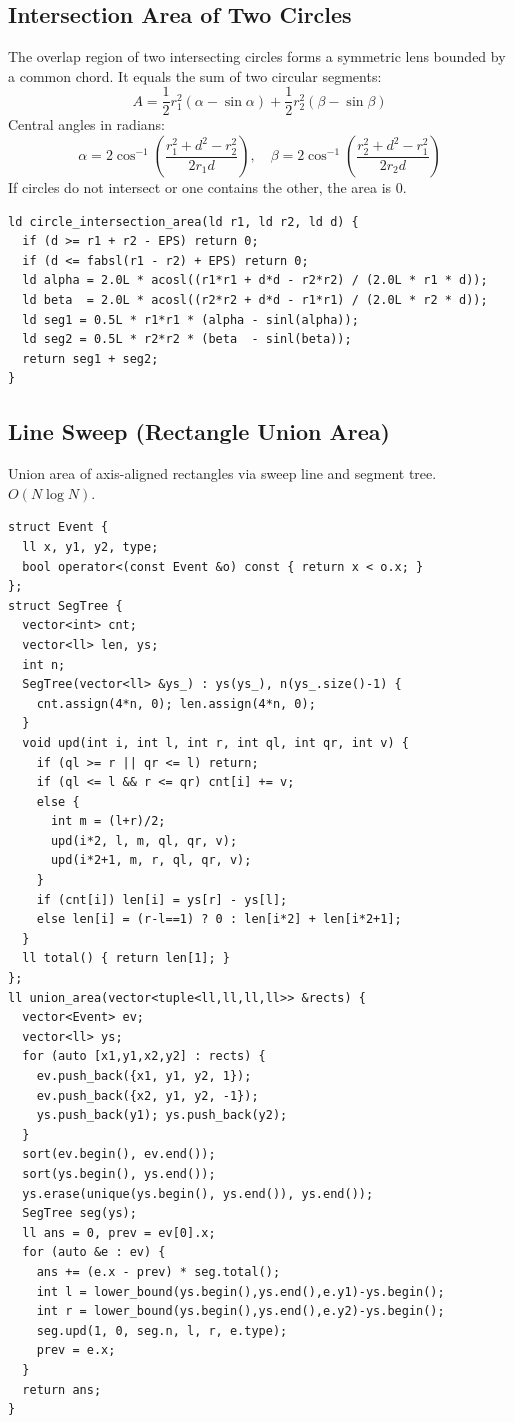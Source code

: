\subsection{Intersection Area of Two Circles}
The overlap region of two intersecting circles forms a symmetric lens bounded by a common chord.
It equals the sum of two circular segments:
\[A = \frac{1}{2}r_1^2(\alpha - \sin\alpha) + \frac{1}{2}r_2^2(\beta - \sin\beta)\]
Central angles in radians:
\[\alpha = 2\cos^{-1}\left(\frac{r_1^2 + d^2 - r_2^2}{2r_1 d}\right),\quad \beta = 2\cos^{-1}\left(\frac{r_2^2 + d^2 - r_1^2}{2r_2 d}\right)\]
If circles do not intersect or one contains the other, the area is 0.
\begin{verbatim}
ld circle_intersection_area(ld r1, ld r2, ld d) {
  if (d >= r1 + r2 - EPS) return 0;
  if (d <= fabsl(r1 - r2) + EPS) return 0;
  ld alpha = 2.0L * acosl((r1*r1 + d*d - r2*r2) / (2.0L * r1 * d));
  ld beta  = 2.0L * acosl((r2*r2 + d*d - r1*r1) / (2.0L * r2 * d));
  ld seg1 = 0.5L * r1*r1 * (alpha - sinl(alpha));
  ld seg2 = 0.5L * r2*r2 * (beta  - sinl(beta));
  return seg1 + seg2;
}
\end{verbatim}

\subsection{Line Sweep (Rectangle Union Area)}
Union area of axis-aligned rectangles via sweep line and segment tree. $O(N \log N)$.
\begin{verbatim}
struct Event {
  ll x, y1, y2, type;
  bool operator<(const Event &o) const { return x < o.x; }
};
struct SegTree {
  vector<int> cnt;
  vector<ll> len, ys;
  int n;
  SegTree(vector<ll> &ys_) : ys(ys_), n(ys_.size()-1) {
    cnt.assign(4*n, 0); len.assign(4*n, 0);
  }
  void upd(int i, int l, int r, int ql, int qr, int v) {
    if (ql >= r || qr <= l) return;
    if (ql <= l && r <= qr) cnt[i] += v;
    else {
      int m = (l+r)/2;
      upd(i*2, l, m, ql, qr, v);
      upd(i*2+1, m, r, ql, qr, v);
    }
    if (cnt[i]) len[i] = ys[r] - ys[l];
    else len[i] = (r-l==1) ? 0 : len[i*2] + len[i*2+1];
  }
  ll total() { return len[1]; }
};
ll union_area(vector<tuple<ll,ll,ll,ll>> &rects) {
  vector<Event> ev;
  vector<ll> ys;
  for (auto [x1,y1,x2,y2] : rects) {
    ev.push_back({x1, y1, y2, 1});
    ev.push_back({x2, y1, y2, -1});
    ys.push_back(y1); ys.push_back(y2);
  }
  sort(ev.begin(), ev.end());
  sort(ys.begin(), ys.end());
  ys.erase(unique(ys.begin(), ys.end()), ys.end());
  SegTree seg(ys);
  ll ans = 0, prev = ev[0].x;
  for (auto &e : ev) {
    ans += (e.x - prev) * seg.total();
    int l = lower_bound(ys.begin(),ys.end(),e.y1)-ys.begin();
    int r = lower_bound(ys.begin(),ys.end(),e.y2)-ys.begin();
    seg.upd(1, 0, seg.n, l, r, e.type);
    prev = e.x;
  }
  return ans;
}
\end{verbatim}

